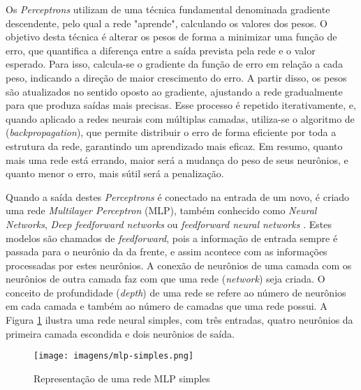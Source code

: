 Os \textit{Perceptrons} utilizam de uma técnica fundamental denominada gradiente descendente, pelo qual 
a rede "aprende", calculando os valores dos pesos.
O objetivo desta técnica é alterar os pesos de forma a minimizar uma função de erro, que quantifica a diferença 
entre a saída prevista pela rede e o valor esperado. Para isso, calcula-se o gradiente da função de erro em relação a cada peso, 
indicando a direção de maior crescimento do erro. A partir disso, os pesos são atualizados no sentido oposto ao gradiente, 
ajustando a rede gradualmente para que produza saídas mais precisas. Esse processo é repetido iterativamente, e, quando aplicado 
a redes neurais com múltiplas camadas, utiliza-se o algoritmo de (\textit{backpropagation}), que permite distribuir o 
erro de forma eficiente por toda a estrutura da rede, garantindo um aprendizado mais eficaz. Em resumo, quanto mais uma rede
está errando, maior será a mudança do peso de seus neurônios, e quanto menor o erro, mais sútil será a penalização.

Quando a saída destes \textit{Perceptrons} é conectado na entrada de um novo, é criado uma rede
\textit{Multilayer Perceptron} (MLP), também conhecido como \textit{Neural Networks}, 
\textit{Deep feedforward networks} ou \textit{feedforward neural networks} \cite{Goodfellow-et-al-2016}.
Estes modelos são chamados de \textit{feedforward}, pois a informação de entrada sempre é passada para o neurônio da
da frente, e assim acontece com as informações processadas por estes neurônios. A conexão de neurônios de uma camada 
com os neurônios de outra camada faz com que uma rede (\textit{network}) seja criada. O conceito de profundidade (\textit{depth})
de uma rede se refere ao número de neurônios em cada camada e também ao número de camadas que uma rede 
possui. A Figura \ref{mlp-simples} ilustra uma rede neural simples, com três entradas, quatro neurônios da primeira camada escondida e 
dois neurônios de saída.

\begin{figure}[htb]
	\caption{\label{mlp-simples}Representação de uma rede MLP simples}
	\begin{center}
	    \texttt{[image: imagens/mlp-simples.png]}
	\end{center}
\end{figure}

\FloatBarrier

